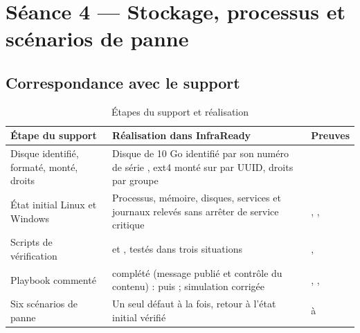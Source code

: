\chapter{Séance 4 — Stockage, processus et scénarios de panne}\label{chap:seance4}


\section{Correspondance avec le support}

\begin{table}[H]
\centering
\caption{Étapes du support et réalisation}\label{tab:s4-corresp}
\begin{tabularx}{\linewidth}{@{}P{3.8cm}LP{2.4cm}@{}}
\toprule
\textbf{Étape du support} & \textbf{Réalisation dans InfraReady} & \textbf{Preuves} \\
\midrule
Disque identifié, formaté, monté, droits & Disque de 10 Go identifié par son numéro de série , ext4 monté sur  par UUID, droits par groupe &  \\
État initial Linux et Windows & Processus, mémoire, disques, services et journaux relevés sans arrêter de service critique & , ,  \\
Scripts de vérification &  et , testés dans trois situations & ,  \\
Playbook commenté &  complété (message publié et contrôle du contenu) :  puis  ; simulation  corrigée & , ,  \\
Six scénarios de panne & Un seul défaut à la fois, retour à l'état initial vérifié &  à  \\
\bottomrule
\end{tabularx}
\end{table}

